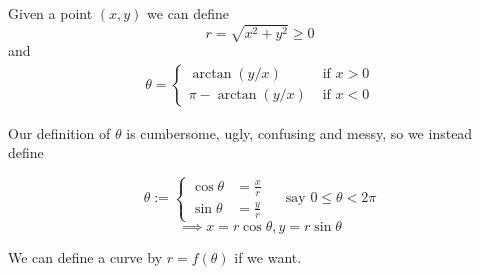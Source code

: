 \documentclass[twoside]{scrartcl}
\begin{document}
\vspace*{5pt}

\begin{definition} Given a point $(x,y)$ we can define 
\[r = \sqrt{x^2 + y^2} \geq 0\]
and 
\[
\begin{aligned}
  \theta = \begin{cases}\arctan(y/x) &\text{ if } x > 0\\
  \pi - \arctan(y/x) &\text{ if } x < 0
  \end{cases}
\end{aligned}
\]
\end{definition}


  \begin{center}
  \end{center}
  
Our definition of $\theta$ is cumbersome, ugly, confusing and messy, so we instead define

\[\theta := \begin{cases}
 \cos\theta &= \frac{x}{r}\\
 \sin\theta &= \frac{y}{r}	
 \end{cases} \quad \text{ say } 0 \leq \theta < 2\pi
\]
\[\boxed{\implies x = r\cos\theta, y = r\sin\theta}\]

We can define a curve by $r = f(\theta)$ if we want.\\ 
\end{document}
